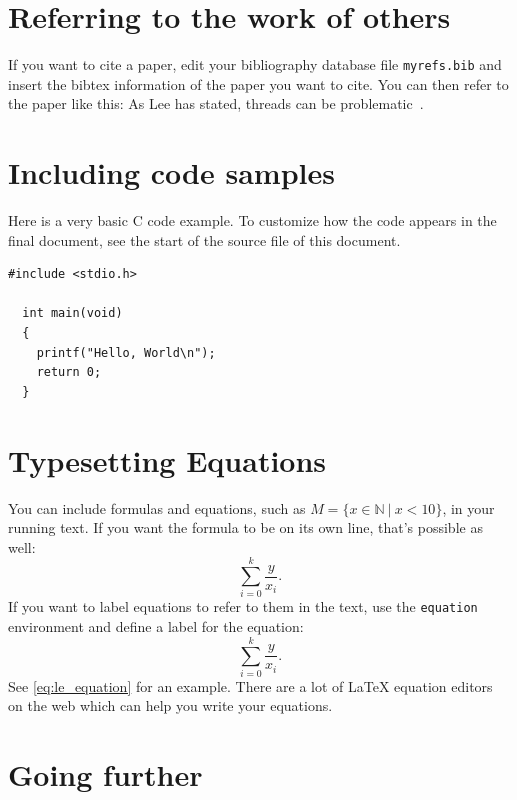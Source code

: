 \documentclass{acm_proc_article-sp}
\begin{document}
\section{Referring to the work of others}

If you want to cite a paper,
edit your bibliography database file \texttt{myrefs.bib}
and insert the bibtex information
of the paper you want to cite.
You can then refer to the paper like this:
As Lee has stated,
threads can be problematic~\cite{L06}.


\section{Including code samples}

Here is a very basic C code example.
To customize how the code appears in the final document,
see the start of the source file of this document.

\begin{lstlisting}
#include <stdio.h>

  int main(void)
  {
    printf("Hello, World\n");
    return 0;
  }
\end{lstlisting}


\section{Typesetting Equations}

You can include formulas and equations,
such as \(M = \{x \in \mathbb{N} ~|~ x < 10\}\),
in your running text.
If you want the formula
to be on its own line,
that's possible as well:
\begin{equation*}
  \sum_{i=0}^{k}\frac{y}{x_{i}}.
\end{equation*}
If you want to label equations
to refer to them in the text,
use the \texttt{equation} environment
and define a label for the equation:
\begin{equation}
  \sum_{i=0}^{k}\frac{y}{x_{i}}.
  \label{eq:le_equation}
\end{equation}
See \autoref{eq:le_equation}
for an example.
There are a lot of LaTeX equation editors on the web
which can help you write your equations.


\section{Going further}
\end{document}
